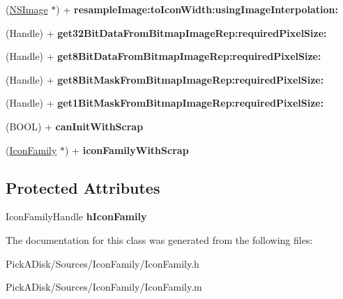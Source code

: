 \begin{DoxyCompactItemize}
\item 
\hypertarget{interface_icon_family_a7b9c49a543006c6071d9b1868681ff91}{
(\hyperlink{class_n_s_image}{NSImage} $\ast$) + {\bfseries resampleImage:toIconWidth:usingImageInterpolation:}}
\label{interface_icon_family_a7b9c49a543006c6071d9b1868681ff91}

\item 
\hypertarget{interface_icon_family_a442e8bf958b0c326c5d7c8f25e6de602}{
(Handle) + {\bfseries get32BitDataFromBitmapImageRep:requiredPixelSize:}}
\label{interface_icon_family_a442e8bf958b0c326c5d7c8f25e6de602}

\item 
\hypertarget{interface_icon_family_a5267afb443b555ad7a4334f6f2a97201}{
(Handle) + {\bfseries get8BitDataFromBitmapImageRep:requiredPixelSize:}}
\label{interface_icon_family_a5267afb443b555ad7a4334f6f2a97201}

\item 
\hypertarget{interface_icon_family_a4b0c49a11c48671fab52480c7c685120}{
(Handle) + {\bfseries get8BitMaskFromBitmapImageRep:requiredPixelSize:}}
\label{interface_icon_family_a4b0c49a11c48671fab52480c7c685120}

\item 
\hypertarget{interface_icon_family_a46dde26e4a69d226d18c9882e6eb6a76}{
(Handle) + {\bfseries get1BitMaskFromBitmapImageRep:requiredPixelSize:}}
\label{interface_icon_family_a46dde26e4a69d226d18c9882e6eb6a76}

\item 
\hypertarget{interface_icon_family_aefc2954fff38769c20f2bae9eec3f685}{
(BOOL) + {\bfseries canInitWithScrap}}
\label{interface_icon_family_aefc2954fff38769c20f2bae9eec3f685}

\item 
\hypertarget{interface_icon_family_ae7bb55b79e71f640aefcc7f38da82a69}{
(\hyperlink{interface_icon_family}{IconFamily} $\ast$) + {\bfseries iconFamilyWithScrap}}
\label{interface_icon_family_ae7bb55b79e71f640aefcc7f38da82a69}

\end{DoxyCompactItemize}
\subsection*{Protected Attributes}
\begin{DoxyCompactItemize}
\item 
\hypertarget{interface_icon_family_a1bd6daa5afeea7068758c468edc44af0}{
IconFamilyHandle {\bfseries hIconFamily}}
\label{interface_icon_family_a1bd6daa5afeea7068758c468edc44af0}

\end{DoxyCompactItemize}


The documentation for this class was generated from the following files:\begin{DoxyCompactItemize}
\item 
PickADisk/Sources/IconFamily/IconFamily.h\item 
PickADisk/Sources/IconFamily/IconFamily.m\end{DoxyCompactItemize}
